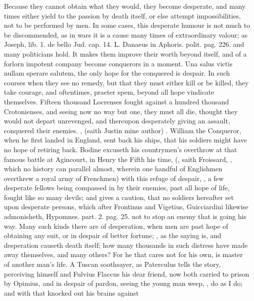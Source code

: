 {Because they cannot obtain what they would, they become desperate, and
many times either yield to the passion by death itself, or else attempt
impossibilities, not to be performed by men. In some cases, this
desperate humour is not much to be discommended, as in wars it is a
cause many times of extraordinary valour; as Joseph, lib. 1. de bello
Jud. cap. 14. L. Danaeus in Aphoris. polit. pag. 226. and many
politicians hold. It makes them improve their worth beyond itself, and
of a forlorn impotent company become conquerors in a moment. Una salus
victis nullam sperare salutem, the only hope for the conquered is
despair. In such courses when they see no remedy, but that they must
either kill or be killed, they take courage, and oftentimes, praeter
spem, beyond all hope vindicate themselves. Fifteen thousand Locrenses
fought against a hundred thousand Crotonienses, and seeing now no way
but one, they must all die, thought they would not depart
unrevenged, and thereupon desperately giving an assault, conquered
their enemies. , (saith Justin mine author)
. William the Conqueror, when he first landed in
England, sent back his ships, that his soldiers might have no hope of
retiring back. Bodine excuseth his countrymen's overthrow at that
famous battle at Agincourt, in Henry the Fifth his time, (,
saith Froissard, , which no history
can parallel almost, wherein one handful of Englishmen overthrew a
royal army of Frenchmen) with this refuge of despair, ,
a few desperate fellows being compassed in by their enemies, past all
hope of life, fought like so many devils; and gives a caution, that no
soldiers hereafter set upon desperate persons, which after
Frontinus and Vigetius, Guicciardini likewise admonisheth, Hypomnes.
part. 2. pag. 25. not to stop an enemy that is going his way. Many such
kinds there are of desperation, when men are past hope of obtaining any
suit, or in despair of better fortune; , as
the saying is, and desperation causeth death itself; how many thousands
in such distress have made away themselves, and many others? For he
that cares not for his own, is master of another man's life. A Tuscan
soothsayer, as Paterculus tells the story, perceiving himself and
Fulvius Flaccus his dear friend, now both carried to prison by Opimius,
and in despair of pardon, seeing the young man weep, , do as I do; and with that knocked out his brains against
}
